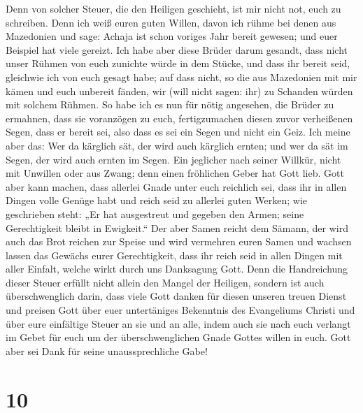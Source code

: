  Denn von solcher Steuer, die den Heiligen geschieht, ist
mir nicht not, euch zu schreiben.  Denn ich weiß euren
guten Willen, davon ich rühme bei denen aus Mazedonien und sage: Achaja
ist schon voriges Jahr bereit gewesen; und euer Beispiel hat viele
gereizt.  Ich habe aber diese Brüder darum gesandt, dass
nicht unser Rühmen von euch zunichte würde in dem Stücke, und dass ihr
bereit seid, gleichwie ich von euch gesagt habe;  auf dass
nicht, so die aus Mazedonien mit mir kämen und euch unbereit fänden, wir
(will nicht sagen: ihr) zu Schanden würden mit solchem Rühmen.
 So habe ich es nun für nötig angesehen, die Brüder zu
ermahnen, dass sie voranzögen zu euch, fertigzumachen diesen zuvor
verheißenen Segen, dass er bereit sei, also dass es sei ein Segen und
nicht ein Geiz.  Ich meine aber das: Wer da kärglich sät,
der wird auch kärglich ernten; und wer da sät im Segen, der wird auch
ernten im Segen.  Ein jeglicher nach seiner Willkür, nicht
mit Unwillen oder aus Zwang; denn einen fröhlichen Geber hat Gott lieb.
 Gott aber kann machen, dass allerlei Gnade unter euch
reichlich sei, dass ihr in allen Dingen volle Genüge habt und reich seid
zu allerlei guten Werken;  wie geschrieben steht: „Er hat
ausgestreut und gegeben den Armen; seine Gerechtigkeit bleibt in
Ewigkeit.``  Der aber Samen reicht dem Sämann, der wird
auch das Brot reichen zur Speise und wird vermehren euren Samen und
wachsen lassen das Gewächs eurer Gerechtigkeit,  dass ihr
reich seid in allen Dingen mit aller Einfalt, welche wirkt durch uns
Danksagung Gott.  Denn die Handreichung dieser Steuer
erfüllt nicht allein den Mangel der Heiligen, sondern ist auch
überschwenglich darin, dass viele Gott danken für diesen unseren treuen
Dienst  und preisen Gott über euer untertäniges
Bekenntnis des Evangeliums Christi und über eure einfältige Steuer an
sie und an alle,  indem auch sie nach euch verlangt im
Gebet für euch um der überschwenglichen Gnade Gottes willen in euch.
 Gott aber sei Dank für seine unaussprechliche Gabe!

\hypertarget{section-9}{%
\section{10}\label{section-9}}

